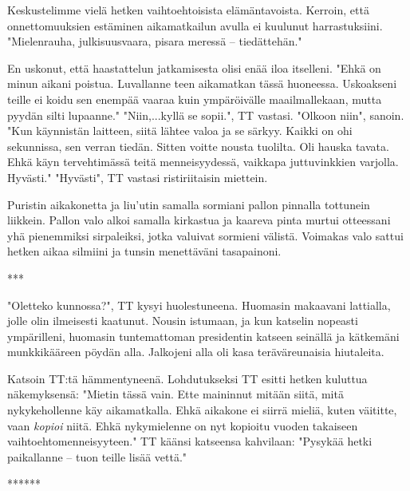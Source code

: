 ﻿\documentclass[a4paper, 12pt, finnish]{article}
\begin{document}
Keskustelimme vielä hetken vaihtoehtoisista elämäntavoista.
Kerroin, että onnettomuuksien estäminen aikamatkailun
avulla ei kuulunut harrastuksiini. "Mielenrauha, julkisuusvaara,
pisara meressä -- tiedättehän."

En uskonut, että haastattelun jatkamisesta olisi enää iloa itselleni.
"Ehkä on minun aikani poistua. Luvallanne teen aikamatkan tässä
huoneessa. Uskoakseni teille ei koidu sen enempää vaaraa kuin
ympäröivälle maailmallekaan, mutta pyydän silti lupaanne."
"Niin,...kyllä se sopii.", TT vastasi.
"Olkoon niin", sanoin. "Kun käynnistän laitteen, siitä lähtee
valoa ja se särkyy. Kaikki on ohi sekunnissa, sen verran tiedän.
Sitten voitte nousta tuolilta. Oli hauska tavata.
Ehkä käyn tervehtimässä teitä menneisyydessä,
vaikkapa juttuvinkkien varjolla. Hyvästi."
"Hyvästi", TT vastasi ristiriitaisin miettein.

Puristin aikakonetta ja liu'utin samalla sormiani pallon pinnalla
tottunein liikkein. Pallon valo alkoi samalla kirkastua ja kaareva
pinta murtui otteessani yhä pienemmiksi sirpaleiksi,
jotka valuivat sormieni välistä. Voimakas valo sattui hetken aikaa
silmiini ja tunsin menettäväni tasapainoni.

***

"Oletteko kunnossa?", TT kysyi huolestuneena. Huomasin makaavani
lattialla, jolle olin ilmeisesti kaatunut. Nousin istumaan, ja
kun katselin nopeasti ympärilleni, huomasin tuntemattoman
presidentin katseen seinällä ja kätkemäni munkkikääreen pöydän alla.
Jalkojeni alla oli kasa teräväreunaisia hiutaleita.

Katsoin TT:tä hämmentyneenä. Lohdutukseksi TT esitti hetken
kuluttua näkemyksensä: "Mietin tässä vain.
Ette maininnut mitään siitä, mitä nykykehollenne käy aikamatkalla.
Ehkä aikakone ei siirrä mieliä, kuten väititte,
vaan \emph{kopioi} niitä. Ehkä nykymielenne on nyt kopioitu
vuoden takaiseen vaihtoehtomenneisyyteen."
TT käänsi katseensa kahvilaan:
"Pysykää hetki paikallanne -- tuon teille lisää vettä."

******
\end{document}
